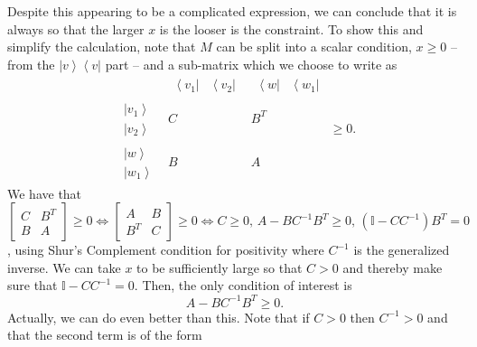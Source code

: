 \documentclass{article}
\begin{document}
Despite this appearing to be a complicated expression, we can conclude
that it is always so that the larger $x$ is the looser is the
constraint. To show this and simplify the calculation, note that
$M$ can be split into a scalar condition, $x\ge0$ -- from the $\left|v\right\rangle \left\langle v\right|$
part -- and a sub-matrix which we choose to write as 
\begin{displaymath}
\begin{array}{c|c|c}
& \begin{array}{cc}
\left\langle v_{1}\right| & \left\langle v_{2}\right|\end{array} & \begin{array}{cc}
\left\langle w\right| & \left\langle w_{1}\right|\end{array}\\
\hline \begin{array}{c}
\left|v_{1}\right\rangle \\
\left|v_{2}\right\rangle 
\end{array} & C & B^{T}\\
\hline \begin{array}{c}
\left|w\right\rangle \\
\left|w_{1}\right\rangle 
\end{array} & B & A
\end{array}\ge0.
\end{displaymath}
We have that $\left[\begin{array}{cc}
C & B^{T}\\
B & A
\end{array}\right]\ge0\iff\left[\begin{array}{cc}
A & B\\
B^{T} & C
\end{array}\right]\ge0\iff C\ge0,\,A-BC^{-1}B^{T}\ge0,\,(\mathbb{I}-CC^{-1})B^{T}=0$, using Shur's Complement condition for positivity where $C^{-1}$
is the generalized inverse. We can take $x$ to be sufficiently large so that $C>0$ and thereby
make sure that $\mathbb{I}-CC^{-1}=0$. Then, the only condition
of interest is 
\begin{displaymath}
A-BC^{-1}B^{T}\ge0.
\end{displaymath}
Actually, we can do even better than this. Note that if $C>0$ then
$C^{-1}>0$ and that the second term is of the form 
\end{document}
